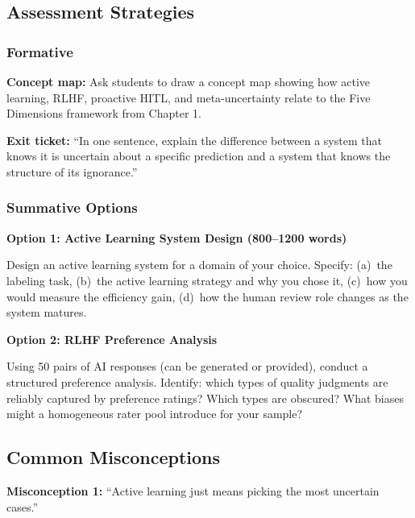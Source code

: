 \subsection*{Assessment Strategies}

\subsubsection*{Formative}

\textbf{Concept map:} Ask students to draw a concept map showing how active learning, RLHF, proactive HITL, and meta-uncertainty relate to the Five Dimensions framework from Chapter 1.

\textbf{Exit ticket:} ``In one sentence, explain the difference between a system that knows it is uncertain about a specific prediction and a system that knows the structure of its ignorance.''

\subsubsection*{Summative Options}

\textbf{Option 1: Active Learning System Design (800--1200 words)}

Design an active learning system for a domain of your choice. Specify: (a)~the labeling task, (b)~the active learning strategy and why you chose it, (c)~how you would measure the efficiency gain, (d)~how the human review role changes as the system matures.

\textbf{Option 2: RLHF Preference Analysis}

Using 50 pairs of AI responses (can be generated or provided), conduct a structured preference analysis. Identify: which types of quality judgments are reliably captured by preference ratings? Which types are obscured? What biases might a homogeneous rater pool introduce for your sample?

\subsection*{Common Misconceptions}

\textbf{Misconception 1:} ``Active learning just means picking the most uncertain cases.''

